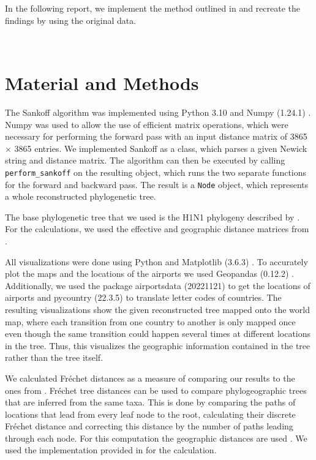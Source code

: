 \documentclass{article}
\begin{document}
In the following report, we implement the method outlined in
\cite{reimeringPhylogeographicReconstructionUsing2020} and recreate the findings
by using the original data.

\ \\
\section{Material and Methods}
The Sankoff algorithm was implemented using Python 3.10
\cite{pythonsoftwarefoundationWelcomePythonOrg2023} and Numpy (1.24.1)
\cite{harrisArrayProgrammingNumPy2020}. Numpy was used to allow the use of
efficient matrix operations, which were necessary for performing the forward
pass with an input distance matrix of 3865 $\times$ 3865 entries. We implemented
Sankoff as a class, which parses a given Newick string and distance matrix. The
algorithm can then be executed by calling \texttt{perform\_sankoff} on the
resulting object, which runs the two separate functions for the forward and
backward pass. The result is a \texttt{Node} object, which represents a whole
reconstructed phylogenetic tree.

The base phylogenetic tree that we used is the H1N1 phylogeny described by
\cite{reimeringPhylogeographicReconstructionUsing2020}. For the calculations, we
used the effective and geographic distance matrices from
\cite{reimeringDistanceMatricesParsimonious2019}. 

All visualizations were done using Python and Matplotlib (3.6.3)
\cite{MatplotlibVisualizationPython}. To accurately plot the maps and the
locations of the airports we used Geopandas (0.12.2)
\cite{GeoPandas12GeoPandas}. Additionally, we used the package airportsdata
(20221121) \cite{borsettiAirportsdataExtensiveDatabase2022} to get the locations
of airports and pycountry (22.3.5) \cite{theunePycountryISOCountry} to translate
letter codes of countries. The resulting visualizations show the given
reconstructed tree mapped onto the world map, where each transition from one
country to another is only mapped once even though the same transition could
happen several times at different locations in the tree. Thus, this visualizes
the geographic information contained in the tree rather than the tree itself.

We calculated Fr\'{e}chet distances as a measure of comparing our results to the
ones from \cite{reimeringPhylogeographicReconstructionUsing2020}. Fr\'{e}chet
tree distances can be used to compare phylogeographic trees that are inferred
from the same taxa. This is done by comparing the paths of locations that lead
from every leaf node to the root, calculating their discrete Fr\'{e}chet
distance and correcting this distance by the number of paths leading through
each node. For this computation the geographic distances are used
\cite{reimeringFrechetTreeDistance2018}. We used the implementation provided in
\cite{reimeringFrechetTreeDistance2018} for the calculation.
\end{document}
